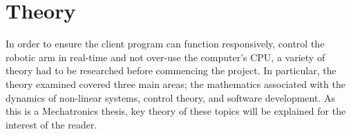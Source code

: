 \documentclass[12pt,openany,a4paper]{book}
\begin{document}
%
%
%

\cleardoublepage

\chapter{Theory}
In order to ensure the client program can function responsively, control the robotic arm in real-time and not over-use the computer's CPU, a variety of theory had to be researched before commencing the project. In particular, the theory examined covered three main areas; the mathematics associated with the dynamics of non-linear systems, control theory, and software development. As this is a Mechatronics thesis, key theory of these topics will be explained for the interest of the reader.
\end{document}
